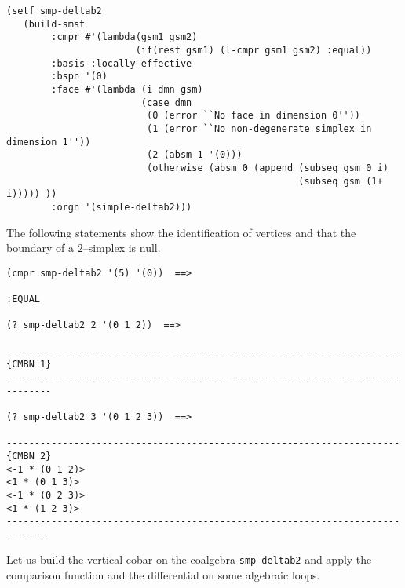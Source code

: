 {\footnotesize\begin{verbatim}
(setf smp-deltab2
   (build-smst
        :cmpr #'(lambda(gsm1 gsm2)
                       (if(rest gsm1) (l-cmpr gsm1 gsm2) :equal))
        :basis :locally-effective
        :bspn '(0)
        :face #'(lambda (i dmn gsm)
                        (case dmn
                         (0 (error ``No face in dimension 0''))
                         (1 (error ``No non-degenerate simplex in dimension 1''))
                         (2 (absm 1 '(0)))
                         (otherwise (absm 0 (append (subseq gsm 0 i)
                                                    (subseq gsm (1+ i))))) ))
        :orgn '(simple-deltab2)))
\end{verbatim}}
The following statements show the identification of vertices and that the boundary
of a $2$--simplex  is null.
{\footnotesize\begin{verbatim}
(cmpr smp-deltab2 '(5) '(0))  ==>

:EQUAL

(? smp-deltab2 2 '(0 1 2))  ==>

----------------------------------------------------------------------{CMBN 1}
------------------------------------------------------------------------------

(? smp-deltab2 3 '(0 1 2 3))  ==>

----------------------------------------------------------------------{CMBN 2}
<-1 * (0 1 2)>
<1 * (0 1 3)>
<-1 * (0 2 3)>
<1 * (1 2 3)>
------------------------------------------------------------------------------
\end{verbatim}}
Let us build the vertical cobar on the coalgebra {\tt smp-deltab2} and apply
the comparison function and the differential on some algebraic loops.
